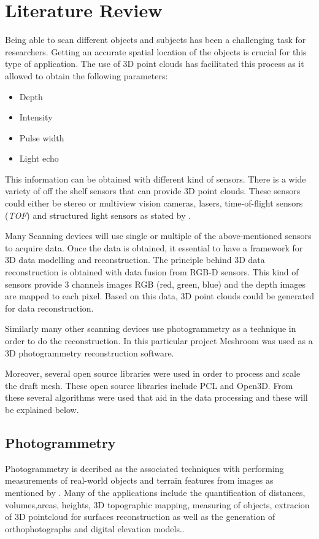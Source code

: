 \documentclass[12pt]{report}
\begin{document}
\chapter{Literature Review}
Being able to scan different objects and subjects has been a challenging task for researchers. Getting an accurate spatial location of the objects is crucial for this type of application.
The use of 3D point clouds has facilitated this process as it allowed to obtain the following parameters:
\begin{itemize}[]
  \itemsep0em 
  \item Depth
  \item Intensity
  \item Pulse width
  \item Light echo
\end{itemize}
This information can be obtained with different kind of sensors. There is a wide variety of off the shelf sensors that can provide 3D point clouds. 
These sensors could either be stereo or multiview vision cameras, lasers, time-of-flight sensors (\textit{TOF}) and structured light sensors as stated by .

Many Scanning devices will use single or multiple of the above-mentioned sensors to acquire data. Once the data is obtained, it essential to have a framework for 3D data modelling and reconstruction.
The principle behind 3D data reconstruction is obtained with data fusion from RGB-D sensors. This kind of sensors provide 3 channels images RGB (red, green, blue) and the depth images are mapped to each pixel. Based on this data, 3D point clouds could be generated for data reconstruction.

Similarly many other scanning devices use photogrammetry as a technique in order to do the reconstruction. In this particular project Meshroom was used as a 3D photogrammetry reconstruction software.

Moreover, several open source libraries were used in order to process and scale the draft mesh. These open source libraries include PCL and Open3D. From these several algorithms were used that aid in the data processing and these will be explained below. 
\enlargethispage{\baselineskip}

\section{Photogrammetry}
Photogrammetry is decribed as the associated techniques with performing measurements of real-world objects and terrain features from images as mentioned by .
Many of the applications include the quantification of distances, volumes,areas, heights, 3D topographic mapping, measuring of objects, extracion of 3D pointcloud for surfaces reconstruction as well as the generation of orthophotographs and digital elevation models..
\end{document}
